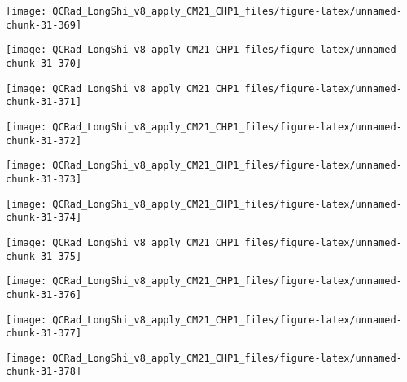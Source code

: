 \documentclass[
  10pt,
  a4paper,oneside]{article}
\begin{document}
\begin{center}\texttt{[image: QCRad\_LongShi\_v8\_apply\_CM21\_CHP1\_files/figure-latex/unnamed-chunk-31-369]} \end{center}

\begin{center}\texttt{[image: QCRad\_LongShi\_v8\_apply\_CM21\_CHP1\_files/figure-latex/unnamed-chunk-31-370]} \end{center}

\begin{center}\texttt{[image: QCRad\_LongShi\_v8\_apply\_CM21\_CHP1\_files/figure-latex/unnamed-chunk-31-371]} \end{center}

\begin{center}\texttt{[image: QCRad\_LongShi\_v8\_apply\_CM21\_CHP1\_files/figure-latex/unnamed-chunk-31-372]} \end{center}

\begin{center}\texttt{[image: QCRad\_LongShi\_v8\_apply\_CM21\_CHP1\_files/figure-latex/unnamed-chunk-31-373]} \end{center}

\begin{center}\texttt{[image: QCRad\_LongShi\_v8\_apply\_CM21\_CHP1\_files/figure-latex/unnamed-chunk-31-374]} \end{center}

\begin{center}\texttt{[image: QCRad\_LongShi\_v8\_apply\_CM21\_CHP1\_files/figure-latex/unnamed-chunk-31-375]} \end{center}

\begin{center}\texttt{[image: QCRad\_LongShi\_v8\_apply\_CM21\_CHP1\_files/figure-latex/unnamed-chunk-31-376]} \end{center}

\begin{center}\texttt{[image: QCRad\_LongShi\_v8\_apply\_CM21\_CHP1\_files/figure-latex/unnamed-chunk-31-377]} \end{center}

\begin{center}\texttt{[image: QCRad\_LongShi\_v8\_apply\_CM21\_CHP1\_files/figure-latex/unnamed-chunk-31-378]} \end{center}
\end{document}
